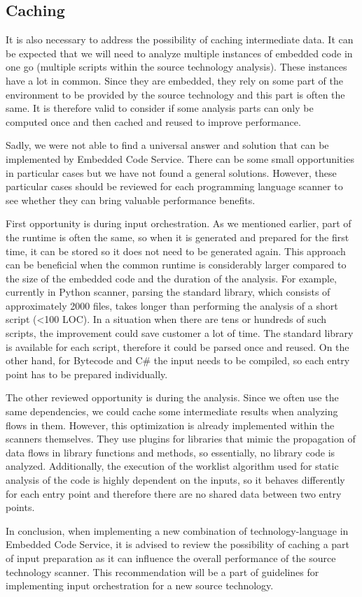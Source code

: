 \subsection{Caching}
It is also necessary to address the possibility of caching intermediate data. It can be expected that we will need to analyze multiple instances of embedded code in one go (multiple scripts within the source technology analysis). These instances have a lot in common. Since they are embedded, they rely on some part of the environment to be provided by the source technology and this part is often the same. It is therefore valid to consider if some analysis parts can only be computed once and then cached and reused to improve performance. 
\par
Sadly, we were not able to find a universal answer and solution that can be implemented by Embedded Code Service. There can be some small opportunities in particular cases but we have not found a general solutions. However, these particular cases should be reviewed for each programming language scanner to see whether they can bring valuable performance benefits.
\par
First opportunity is during input orchestration. As we mentioned earlier, part of the runtime is often the same, so when it is generated and prepared for the first time, it can be stored so it does not need to be generated again. This approach can be beneficial when the common runtime is considerably larger compared to the size of the embedded code and the duration of the analysis. For example, currently in Python scanner, parsing the standard library, which consists of approximately 2000 files, takes longer than performing the analysis of a short script (<100 LOC). In a situation when there are tens or hundreds of such scripts, the improvement could save customer a lot of time. The standard library is available for each script, therefore it could be parsed once and reused. On the other hand, for Bytecode and C\# the input needs to be compiled, so each entry point has to be prepared individually.
\par
The other reviewed opportunity is during the analysis. Since we often use the same dependencies, we could cache some intermediate results when analyzing flows in them. However, this optimization is already implemented within the scanners themselves. They use plugins for libraries that mimic the propagation of data flows in library functions and methods, so essentially, no library code is analyzed. Additionally, the execution of the worklist algorithm used for static analysis of the code is highly dependent on the inputs, so it behaves differently for each entry point and therefore there are no shared data between two entry points.
\par
In conclusion, when implementing a new combination of technology-language in Embedded Code Service, it is advised to review the possibility of caching a part of input preparation as it can influence the overall performance of the source technology scanner. This recommendation will be a part of guidelines for implementing input orchestration for a new source technology.
